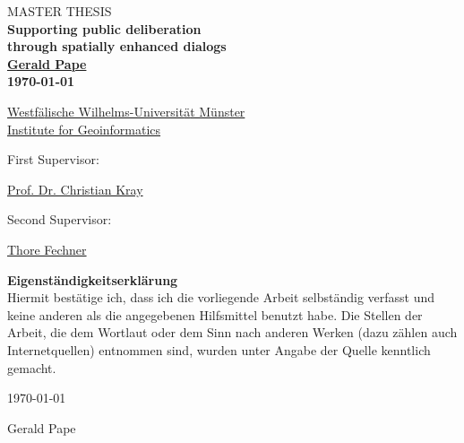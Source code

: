 \onecolumn

\thispagestyle{empty}

\begin{center}
 
\vspace*{5cm}

\textsc{\large MASTER THESIS}\\[1cm]


{ \Huge \textbf{Supporting public deliberation}}\\[0.2cm]
{ \Huge \textbf{through spatially enhanced dialogs}}\\[2.5cm]
 
{\LARGE \textbf{\href{mailto:g.pape@uni-muenster.de}{Gerald Pape}}}\\[1.5cm]
 
{\LARGE \textbf{\today}}\\[5cm]

\end{center}

{\Large
\href{https://www.uni-muenster.de}{Westf{\"a}lische Wilhelms-Universit{\"a}t M{\"u}nster}\\[0.3cm]
\href{http://www.ifgi.de}{Institute for Geoinformatics}\\[0.7cm]

\parbox{4.5cm}{First Supervisor:} \href{mailto:c.kray@uni-muenster.de}{Prof. Dr. Christian Kray}\\[0.3cm]
\parbox{4.5cm}{Second Supervisor:} \href{mailto:t.fechner@uni-muenster.de}{Thore Fechner}
}

\vfill

\newpage

\thispagestyle{empty}

{ \LARGE \textbf{Eigenständigkeitserklärung}}\\[0.2cm]

Hiermit bestätige ich, dass ich die vorliegende Arbeit selbständig verfasst und keine anderen als die angegebenen Hilfsmittel benutzt habe. Die Stellen der Arbeit, die dem Wortlaut oder dem Sinn nach anderen Werken (dazu zählen auch Internetquellen) entnommen sind, wurden unter Angabe der Quelle kenntlich gemacht.

\par
\vspace*{10ex}
\noindent
\begin{minipage}[b][][t]{0.4\textwidth}
	\today
\end{minipage}
\hfill
\begin{minipage}[b][][b]{0.4\textwidth}
	\hrulefill
\end{minipage}

\par
\vspace*{-1ex}
\noindent
\hfill
\begin{minipage}{0.4\textwidth}
	\centering
	\vspace*{1ex}
	Gerald Pape
\end{minipage}


\twocolumn